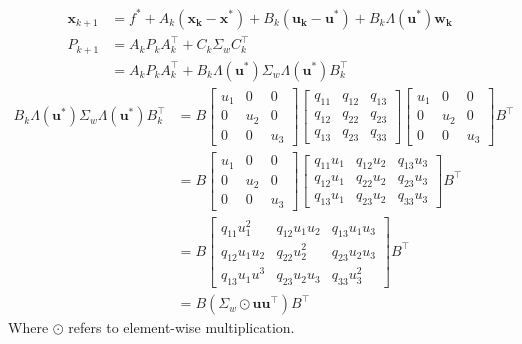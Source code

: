 \documentclass[11pt]{article}
\begin{document}
\begin{align*}
    \mathbf{x}_{k+1} &= f^* + A_k(\mathbf{x_k} - \mathbf{x^*}) + B_k(\mathbf{u_k} - \mathbf{u^*}) + B_k \Lambda(\mathbf{u^*}) \mathbf{w_k} \\
    P_{k+1} &= A_k P_k A_k^\top + C_k \Sigma_w C_k^\top \\
    &= A_k P_k A_k^\top + B_k \Lambda(\mathbf{u^*}) \Sigma_w \Lambda(\mathbf{u^*}) B_k^\top
\end{align*}
\begin{align*}
    B_k \Lambda(\mathbf{u^*}) \Sigma_w \Lambda(\mathbf{u^*}) B_k^\top &= B \begin{bmatrix}
        u_1 & 0 & 0 \\
        0 & u_2 & 0 \\
        0 & 0 & u_3
    \end{bmatrix} \begin{bmatrix}
        q_{11} & q_{12} & q_{13} \\
        q_{12} & q_{22} & q_{23} \\
        q_{13} & q_{23} & q_{33}
    \end{bmatrix}
    \begin{bmatrix}
        u_1 & 0 & 0 \\
        0 & u_2 & 0 \\
        0 & 0 & u_3
    \end{bmatrix} B^\top \\
    &= B \begin{bmatrix}
        u_1 & 0 & 0 \\
        0 & u_2 & 0 \\
        0 & 0 & u_3
    \end{bmatrix} \begin{bmatrix}
        q_{11} u_1 & q_{12}u_2 & q_{13}u_3 \\
        q_{12}u_1 & q_{22} u_2& q_{23}u_3 \\
        q_{13}u_1 & q_{23} u_2& q_{33} u_3
    \end{bmatrix} B^\top \\
    &= B \begin{bmatrix}
        q_{11} u_1^2 & q_{12}u_1u_2 & q_{13}u_1u_3 \\
        q_{12}u_1 u_2& q_{22} u_2^2& q_{23}u_2u_3 \\
        q_{13}u_1u^3 & q_{23} u_2u_3& q_{33} u_3^2
    \end{bmatrix} B^\top \\
    &= B \left( \Sigma_w \odot \mathbf{u} \mathbf{u}^\top \right) B^\top
\end{align*}
Where $\odot$ refers to element-wise multiplication.\\
\end{document}
